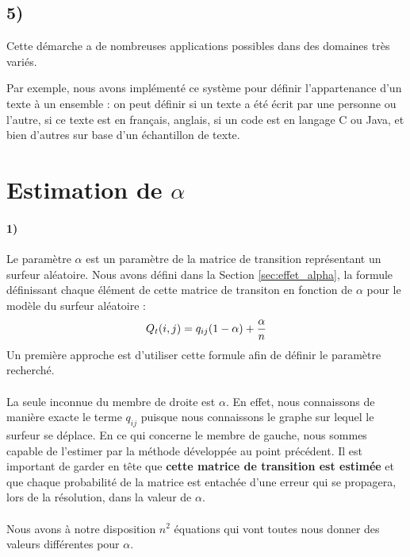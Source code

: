 \documentclass[a4paper,titlepage]{report}
\begin{document}
\subsection{5)}
Cette démarche a de nombreuses applications possibles dans des domaines très variés.

 Par exemple, nous avons implémenté ce système pour définir l'appartenance d'un texte à un ensemble : on peut définir si un texte a été écrit par une personne ou l'autre, si ce texte est en français, anglais, si un code est en langage C ou Java, et bien d'autres sur base d'un échantillon de texte. 

\section{Estimation de $\alpha$}
\paragraph{1)} Le paramètre $\alpha$ est un paramètre de la matrice de transition représentant un surfeur aléatoire. Nous avons défini dans la Section \ref{sec:effet_alpha}, la formule définissant chaque élément de cette matrice de transiton en fonction de $\alpha$ pour le modèle du surfeur aléatoire : 
\[
Q_t(i,j) = q_{ij} (1 - \alpha) + \dfrac{\alpha}{n}\\
\]
Un première approche est d'utiliser cette formule afin de définir le paramètre recherché. 
\paragraph{}
La seule inconnue du membre de droite est $\alpha$. En effet, nous connaissons de manière exacte le terme $q_{ij}$ puisque nous connaissons le graphe sur lequel le surfeur se déplace. En ce qui concerne le membre de gauche, nous sommes capable de l'estimer par la méthode développée au point précédent. Il est important de garder en tête que \textbf{cette matrice de transition est estimée} et que chaque probabilité de la matrice est entachée d'une erreur qui se propagera, lors de la résolution, dans la valeur de $\alpha$. 
\paragraph{}
Nous avons à notre disposition $n^2$ équations qui vont toutes nous donner des valeurs différentes pour $\alpha$. 
\end{document}
